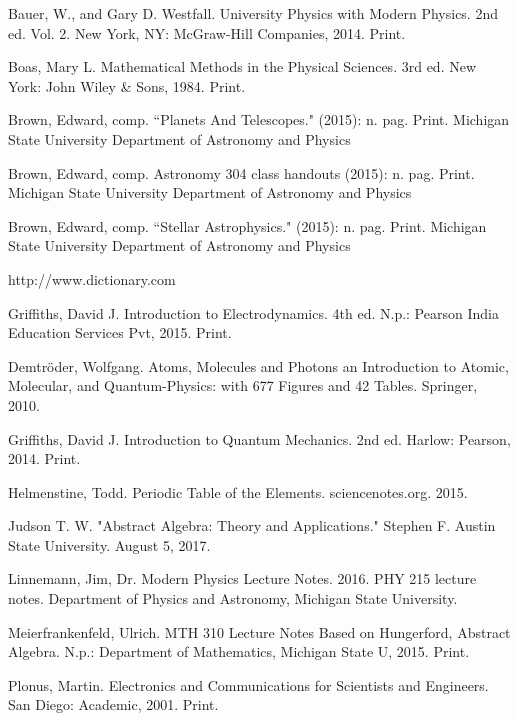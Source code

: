{\footnotesize
\begin{thebibliography}{99}
	 Bauer, W., and Gary D. Westfall. University Physics with Modern Physics. 2nd ed. Vol. 2. New York, NY: McGraw-Hill Companies, 2014. Print. 	
	
	 Boas, Mary L. Mathematical Methods in the Physical Sciences. 3rd ed. New York: John Wiley \& Sons, 1984. Print. 
	
	 Brown, Edward, comp. ``Planets And Telescopes." (2015): n. pag. Print. Michigan State University Department of Astronomy and Physics
	
	 Brown, Edward, comp. Astronomy 304 class handouts (2015): n. pag. Print. Michigan State University Department of Astronomy and Physics
	
	 Brown, Edward, comp. ``Stellar Astrophysics." (2015): n. pag. Print. Michigan State University Department of Astronomy and Physics
	
	 http://www.dictionary.com
	
	 Griffiths, David J. Introduction to Electrodynamics. 4th ed. N.p.: Pearson India Education Services Pvt, 2015. Print. 
	
	 Demtr\"{o}der, Wolfgang. Atoms, Molecules and Photons an Introduction to Atomic, Molecular, and Quantum-Physics: with 677 Figures and 42 Tables. Springer, 2010. 
	
	  Griffiths, David J. Introduction to Quantum Mechanics. 2nd ed. Harlow: Pearson, 2014. Print. 
	
	 Helmenstine, Todd. Periodic Table of the Elements. sciencenotes.org. 2015.
	
	 Judson T. W. "Abstract Algebra: Theory and Applications." Stephen F. Austin State University. August 5, 2017.
	
	 Linnemann, Jim, Dr. Modern Physics Lecture Notes. 2016. PHY 215 lecture notes. Department of Physics and Astronomy, Michigan State University. 
	
	 Meierfrankenfeld, Ulrich. MTH 310 Lecture Notes Based on Hungerford, Abstract Algebra. N.p.: Department of Mathematics, Michigan State U, 2015. Print. 
	
	 Plonus, Martin. Electronics and Communications for Scientists and Engineers. San Diego: Academic, 2001. Print. 
	

\end{thebibliography}}
